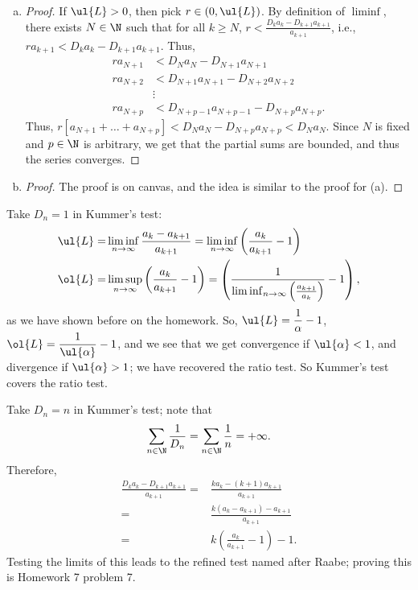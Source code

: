 \begin{enumerate}[(a)]
	\item
	\begin{proof}
		If \(\ul{L}>0\), then pick \(r\in(0,\ul{L})\). By definition of \(\liminf\), there exists \(N\in\N\) such that for all \(k\geq N\), \(r<\displaystyle\frac{D_ka_k-D_{k+1}a_{k+1}}{a_{k+1}}\), i.e., \(ra_{k+1}<D_ka_k-D_{k+1}a_{k+1}\). Thus, 
		\begin{align*}
			ra_{N+1}&<D_Na_N-D_{N+1}a_{N+1}\\
			ra_{N+2}&<D_{N+1}a_{N+1}-D_{N+2}a_{N+2}\\
			&\vdots\\
			ra_{N+p}&<D_{N+p-1}a_{N+p-1}-D_{N+p}a_{N+p}.
		\end{align*}
		Thus, \(r[a_{N+1}+\dots+a_{N+p}]<D_Na_N-D_{N+p}a_{N+p}<D_Na_N\). Since \(N\) is fixed and \(p\in\N\) is arbitrary, we get that the partial sums are bounded, and thus the series converges.
	\end{proof}
	
	\item 
	\begin{proof}
		The proof is on canvas, and the idea is similar to the proof for (a).
	\end{proof}
\end{enumerate}
\begin{example}
	Take \(D_n=1\) in Kummer's test:
	\begin{align*}
		\ul{L}=&\liminf_{n\to\infty}\frac{a_k-a_{k+1}}{a_{k+1}}=\liminf_{n\to\infty}\left(\frac{a_k}{a_{k+1}}-1\right)\\
		\ol{L}=&\limsup_{n\to\infty}\left(\frac{a_k}{a_{k+1}}-1\right)=\left(\frac{1}{\liminf_{n\to\infty}\left(\frac{a_{k+1}}{a_k}\right)}-1\right),
	\end{align*}
	as we have shown before on the homework. So, \(\ul{L}=\displaystyle\frac{1}{\alpha}-1\), \(\ol{L}=\displaystyle\frac{1}{\ul{\alpha}}-1\), and we see that we get convergence if \(\ul{\alpha}<1\), and divergence if \(\ul{\alpha}>1\); we have recovered the ratio test. So Kummer's test covers the ratio test.
\end{example}
\begin{example}
	Take \(D_n=n\) in Kummer's test; note that 
	\begin{equation*}
		\sum_{n\in\N}\displaystyle\frac{1}{D_n}=\sum_{n\in\N}\frac{1}{n}=+\infty.
	\end{equation*}
	Therefore, 
	\begin{align*}
		\frac{D_ka_k-D_{k+1}a_{k+1}}{a_{k+1}}=&\frac{ka_k-(k+1)a_{k+1}}{a_{k+1}}\\
		=&\frac{k(a_k-a_{k+1})-a_{k+1}}{a_{k+1}}\\
		=&k\left(\frac{a_k}{a_{k+1}}-1\right)-1.
	\end{align*}
	Testing the limits of this leads to the refined test named after Raabe; proving this is Homework 7 problem 7.
\end{example}
